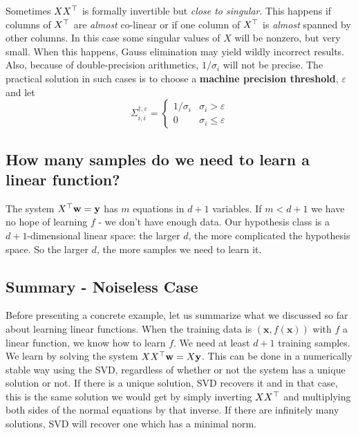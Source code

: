 Sometimes $XX^{\top}$ is formally invertible but \textit{close to singular}. This happens if columns of $X^{\top}$ are \textit{almost} co-linear or if one column of $X^{\top}$ is \textit{almost} spanned by other columns. In this case some singular values of $X$ will be nonzero, but very small. When this happens, Gauss elimination may yield wildly incorrect results. Also, because of double-precision arithmetics, $1/\sigma_i$ will not be precise. The practical solution in such cases is to choose a \textbf{machine precision threshold}, $\varepsilon$ and let
\[
  \Sigma^{\dagger,\varepsilon}_{i,i} =
                           \begin{cases}
                             1/\sigma_i & \sigma_i>\varepsilon\\
                             0 & \sigma_i \leq \varepsilon
                           \end{cases}
                         \]




\subsection{How many samples do we need to learn a linear function?}
The system $X^{\top} \mathbf{w}=\mathbf{y}$ has $m$ equations in $d+1$ variables. If $m<d+1$ we have no hope of learning $f$ - we don't have enough data.
Our hypothesis class is a $d+1$-dimensional linear space: the larger $d$, the more complicated the hypothesis space. So the larger $d$, the more samples we need to learn it.


\subsection{Summary - Noiseless Case}
Before presenting a concrete example, let us summarize what we discussed so far about learning linear functions. When the training data is $(\mathbf{x},f(\mathbf{x}))$ with $f$ a linear function, we know how to learn $f$. We need at least $d+1$ training samples. We learn by solving the system $XX^{\top} \mathbf{w}=X\mathbf{y}$. This can be done in a numerically stable way using the SVD, regardless of whether or not the system has a unique solution or not.
If there is a unique solution, SVD recovers it and in that case, this is the same solution we would get by simply inverting $XX^{\top}$ and multiplying both sides of the normal equations by that inverse.
If there are infinitely many solutions, SVD will recover one which has a minimal norm.


